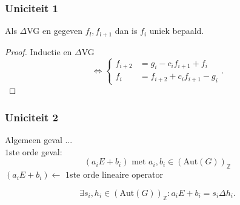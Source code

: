 \documentclass[20pt]{beamer}
\begin{document}
\begin{frame}
    \frametitle{Uniciteit 1}
    \vspace*{-0.3cm}
    \begin{theorem}[uniciteitsvoorwaarde]
        Als $\Delta$VG en gegeven $f_l,f_{l+1}$ dan is $f_i$ uniek bepaald.
    \end{theorem}
    \pause
    \begin{proof}
        Inductie en $\Delta$VG
        \vspace*{-0.5cm}
        $$ \Leftrightarrow  \left\{\begin{aligned}
                f_{i+2} & = g_i - c_i f_{i+1} +f_i     \\
                f_{i}   & = f_{i+2} + c_i f_{i+1} -g_i
            \end{aligned} \right. .$$
        \vspace*{-1.15cm}
    \end{proof}
\end{frame}

\begin{frame}
    \frametitle{Uniciteit 2}
    Algemeen geval ... \pause \\
    $1$ste orde geval:
    $$ (a_iE + b_i) \text{ met } a_i,b_i \in (\text{Aut}(G))_{\mathbb{Z}}$$\pause
    $(a_iE + b_i) \leftarrow$ \small{$1$ste orde lineaire operator} \pause
    \begin{theorem}
        \vspace*{-0.75cm}
        $$ \exists s_i,h_i \in (\text{Aut}(G))_{\mathbb{Z}} :  a_iE + b_i = s_i\Delta h_i.$$
    \end{theorem}
\end{frame}
\end{document}
